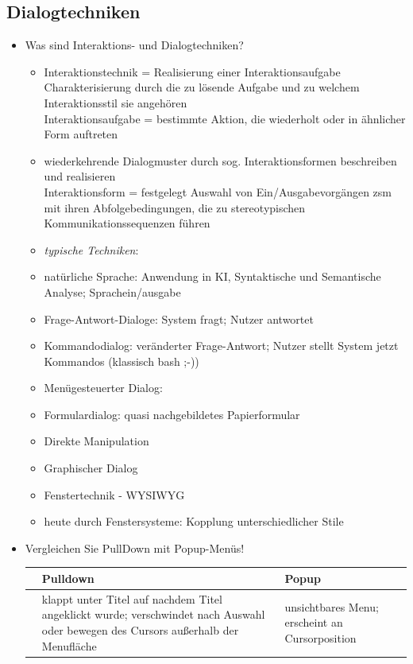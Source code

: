 \subsection{Dialogtechniken}
\begin{itemize}
	\item Was sind Interaktions- und Dialogtechniken?
	\begin{itemize}
		\item Interaktionstechnik = Realisierung einer Interaktionsaufgabe\\
		Charakterisierung durch die zu lösende Aufgabe und zu welchem Interaktionsstil sie angehören\\
		Interaktionsaufgabe = bestimmte Aktion, die wiederholt oder in ähnlicher Form auftreten
		\item wiederkehrende Dialogmuster durch sog. Interaktionsformen beschreiben und realisieren\\
		Interaktionsform = festgelegt Auswahl von Ein/Ausgabevorgängen zsm mit ihren Abfolgebedingungen, die zu stereotypischen Kommunikationssequenzen führen
		\item \textit{typische Techniken}:
		\item natürliche Sprache: Anwendung in KI, Syntaktische und Semantische Analyse; Sprachein/ausgabe
		\item Frage-Antwort-Dialoge: System fragt; Nutzer antwortet
		\item Kommandodialog: veränderter Frage-Antwort; Nutzer stellt System jetzt Kommandos (klassisch bash ;-))
		\item Menügesteuerter Dialog: 
		\item Formulardialog: quasi nachgebildetes Papierformular
		\item Direkte Manipulation
		\item Graphischer Dialog
		\item Fenstertechnik - WYSIWYG
		\item heute durch Fenstersysteme: Kopplung unterschiedlicher Stile
	\end{itemize}
	\item Vergleichen Sie PullDown mit Popup-Menüs!
	\begin{table}[!h]
		\centering
		\begin{tabular}{|l|p{15em}|p{15em}|}
			\hline
			&\textbf{Pulldown} & \textbf{Popup}\\
			\hline
			&klappt unter Titel auf nachdem Titel angeklickt wurde; verschwindet nach Auswahl oder bewegen des Cursors außerhalb der Menufläche & unsichtbares Menu; erscheint an Cursorposition\\

\end{tabular}
\end{table}
\end{itemize}
